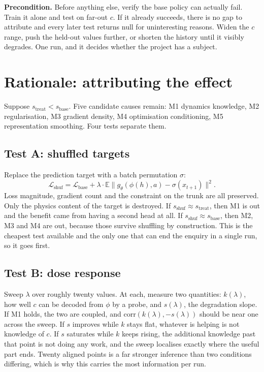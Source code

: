 \documentclass[9pt]{extarticle}
\begin{document}
\textbf{Precondition.} Before anything else, verify the base policy can actually fail. Train it alone and test on far-out $c$. If it already succeeds, there is no gap to attribute and every later test returns null for uninteresting reasons. Widen the $c$ range, push the held-out values further, or shorten the history until it visibly degrades. One run, and it decides whether the project has a subject.

\section{Rationale: attributing the effect}

Suppose $s_{\text{treat}} < s_{\text{base}}$. Five candidate causes remain: M1 dynamics knowledge, M2 regularisation, M3 gradient density, M4 optimisation conditioning, M5 representation smoothing. Four tests separate them.

\subsection{Test A: shuffled targets}

Replace the prediction target with a batch permutation $\sigma$:
\[
\mathcal{L}_{\text{shuf}} = \mathcal{L}_{\text{base}} + \lambda \cdot \mathbb{E}\big\| g_\theta(\phi(h), a) - \sigma(x_{t+1}) \big\|^2 .
\]
Loss magnitude, gradient count and the constraint on the trunk are all preserved. Only the physics content of the target is destroyed. If $s_{\text{shuf}} \approx s_{\text{treat}}$, then M1 is out and the benefit came from having a second head at all. If $s_{\text{shuf}} \approx s_{\text{base}}$, then M2, M3 and M4 are out, because those survive shuffling by construction. This is the cheapest test available and the only one that can end the enquiry in a single run, so it goes first.

\subsection{Test B: dose response}

Sweep $\lambda$ over roughly twenty values. At each, measure two quantities: $k(\lambda)$, how well $c$ can be decoded from $\phi$ by a probe, and $s(\lambda)$, the degradation slope. If M1 holds, the two are coupled, and $\mathrm{corr}(k(\lambda), -s(\lambda))$ should be near one across the sweep. If $s$ improves while $k$ stays flat, whatever is helping is not knowledge of $c$. If $s$ saturates while $k$ keeps rising, the additional knowledge past that point is not doing any work, and the sweep localises exactly where the useful part ends. Twenty aligned points is a far stronger inference than two conditions differing, which is why this carries the most information per run.
\end{document}
